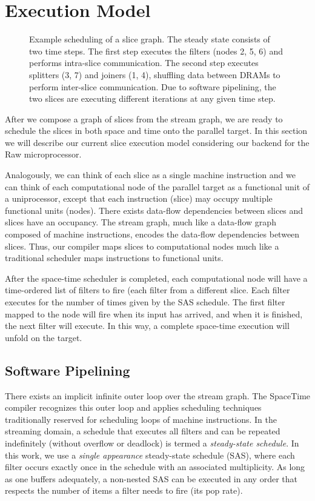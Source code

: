 \section{Execution Model}
\begin{figure}[t]
\centering
{}
\caption{Example scheduling of a slice graph.  The steady state
consists of two time steps.  The first step executes the filters
(nodes 2, 5, 6) and performs intra-slice communication.  The second
step executes splitters (3, 7) and joiners (1, 4), shuffling data
between DRAMs to perform inter-slice communication.  Due to software
pipelining, the two slices are executing different iterations at any
given time step.  \protect\label{fig:slice}}
\end{figure}

After we compose a graph of slices from the stream graph, we are ready
to schedule the slices in both space and time onto the parallel
target.  In this section we will describe our current slice execution
model considering our backend for the Raw microprocessor.

Analogously, we can think of each slice as a single machine
instruction and we can think of each computational node of the
parallel target as a functional unit of a uniprocessor, except that
each instruction (slice) may occupy multiple functional units
(nodes). There exists data-flow dependencies between slices and slices
have an occupancy.  The stream graph, much like a data-flow graph
composed of machine instructions, encodes the data-flow dependencies
between slices. Thus, our compiler maps slices to computational nodes
much like a traditional scheduler maps instructions to functional
units.

After the space-time scheduler is completed, each computational node
will have a time-ordered list of filters to fire (each filter from a
different slice.  Each filter executes for the number of times
given by the SAS schedule.  The first filter mapped to the node
will fire when its input has arrived, and when it is finished, the
next filter will execute.  In this way, a complete space-time
execution will unfold on the target.

\subsection{Software Pipelining}
\label{sec:softpipe}
There exists an implicit infinite outer loop over the stream
graph. The SpaceTime compiler recognizes this outer loop and applies
scheduling techniques traditionally reserved for scheduling loops of
machine instructions.  In the streaming domain, a schedule that
executes all filters and can be repeated indefinitely (without
overflow or deadlock) is termed a {\it steady-state schedule}.  In
this work, we use a {\it single appearance} steady-state schedule
(SAS), where each filter occurs exactly once in the schedule with an
associated multiplicity.  As long as one buffers adequately, a
non-nested SAS can be executed in any order that respects the number
of items a filter needs to fire (its pop rate).

